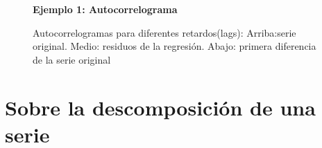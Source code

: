 \begin{figure}[p]
	\centering
	\textbf{Ejemplo 1: Autocorrelograma}\par\medskip
	\caption{Autocorrelogramas para diferentes retardos(lags): Arriba:serie original. Medio: residuos de la regresión. Abajo: primera diferencia de la serie original}\label{fig4}
\end{figure}

\section{Sobre la descomposici\'on de una serie}

